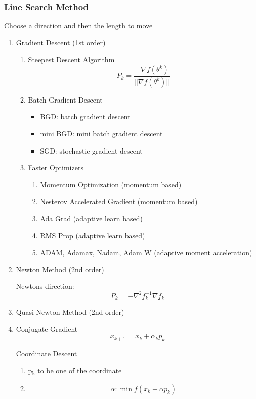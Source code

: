 \documentclass[11pt]{article}
\begin{document}
\subsubsection{Line Search Method}
\label{sec:org4f43abc}
Choose a direction and then the length to move
\begin{enumerate}
\item Gradient Descent (1st order)
\label{sec:org47906a5}
\begin{enumerate}
\item Steepest Descent Algorithm
\label{sec:orge639a1b}
\[P_k = \frac{-\nabla f(\theta^k)}{||\nabla f(\theta^k)||}\]
\item Batch Gradient Descent
\label{sec:org38c1bd1}
\begin{itemize}
\item BGD: batch gradient descent
\item mini BGD: mini batch gradient descent
\item SGD: stochastic gradient descent
\end{itemize}
\item Faster Optimizers
\label{sec:orgf6552fe}
\begin{enumerate}
\item Momentum Optimization (momentum based)
\label{sec:org792e2ba}
\item Nesterov Accelerated Gradient (momentum based)
\label{sec:orgc7aafb3}
\item Ada Grad (adaptive learn based)
\label{sec:orgcac9df4}
\item RMS Prop (adaptive learn based)
\label{sec:org1d66123}
\item ADAM, Adamax, Nadam, Adam W (adaptive moment acceleration)
\label{sec:orgc6099ee}
\end{enumerate}
\end{enumerate}

\item Newton Method (2nd order)
\label{sec:org0847911}

Newtons direction: \[P_{k} = -\nabla^{2}f_{k}^{-1}\nabla f_{k}\]

\item Quasi-Newton Method (2nd order)
\label{sec:org6ccb7a2}
\item Conjugate Gradient
\label{sec:org36bc342}
\[ x_{k+1} = x_k + \alpha_k p_{k} \]

Coordinate Descent
\begin{enumerate}
\item p\textsubscript{k} to be one of the coordinate
\item \[\alpha : \min f(x_k + \alpha p_k)\]
\end{enumerate}


\end{enumerate}
\end{document}

